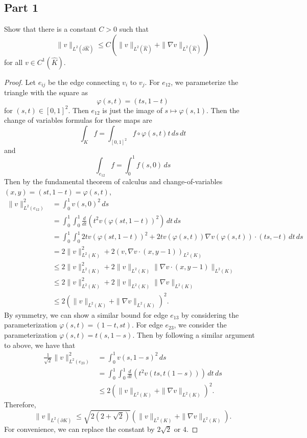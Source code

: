 \documentclass{article}
\theoremstyle{plain}
\begin{document}
\subsection*{Part 1}
Show that there is a constant $C > 0$ such that
\[\|v\|_{L^2(\partial \widehat K)} \leq C(\|v\|_{L^2(\widehat K)} + \|\nabla v\|_{L^2(\widehat K)})\]
for all $v \in C^1(\widehat K)$.
\begin{proof}
	Let  $e_{ij}$ be the edge connecting $v_i$ to $v_j$.
	For $e_{12}$, we parameterize the triangle with the square as
	\[\varphi(s,t) = (ts,1-t)\]
	for $(s,t) \in [0,1]^2$.
	Then $e_{12}$ is just the image of $s \mapsto \varphi(s,1)$.
	Then the change of variables formulas for these maps are
	\[\int_K f = \int_{[0,1]^2} f\circ\varphi(s,t) t\,ds\,dt\]
	and
	\[\int_{e_{12}}f = \int_0^1 f(s,0)\,ds\]
	Then by the fundamental theorem of calculus and change-of-variables $(x,y) = (st, 1-t) = \varphi(s,t)$,
	\begin{align*}
		\|v\|_{L^2(e_{12})}^2 & = \int_0^1v(s,0)^2\,ds                                                                                   \\
		                      & = \int_0^1\int_0^1 \frac{d}{dt}\left(t^2v(\varphi(st,1-t))^2\right)\,dt\,ds                              \\
		                      & = \int_0^1\int_0^1 2tv(\varphi(st,1-t))^2 + 2tv(\varphi(s,t))\nabla v(\varphi(s,t))\cdot (ts,-t)\,dt\,ds \\
		                      & = 2\|v\|_{L^2(K)}^2 + 2(v, \nabla v \cdot (x,y-1))_{L^2(K)}                                              \\
		                      & \leq 2\|v\|_{L^2(K)}^2 + 2\|v\|_{L^2(K)}\|\nabla v \cdot (x,y-1)\|_{L^2(K)}                              \\
		                      & \leq 2\|v\|_{L^2(K)}^2 + 2\|v\|_{L^2(K)}\|\nabla v\|_{L^2(K)}                                            \\
		                      & \leq 2(\|v\|_{L^2(K)} + \|\nabla v\|_{L^2(K)})^2.
	\end{align*}
	By symmetry, we can show a similar bound for edge $e_{13}$ by considering the parameterization $\varphi(s,t) = (1-t,st)$.
	For edge $e_{23}$, we consider the parameterization $\varphi(s,t) = t(s,1-s)$.
	Then by following a similar argument to above, we have that
	\begin{align*}
		\frac{1}{\sqrt{2}}\|v\|_{L^2(e_{23})}^2 & = \int_0^1 v(s,1-s)^2\,ds                                \\
		                                        & = \int_0^1\int_0^1 \frac{d}{dt}(t^2v(ts,t(1-s)))\,dt\,ds \\
		                                        & \leq 2(\|v\|_{L^2(K)} + \|\nabla v\|_{L^2(K)})^2.
	\end{align*}
	Therefore,
	\begin{equation*}
		\|v\|_{L^2(\partial K)} \leq \sqrt{2(2 + \sqrt{2})}(\|v\|_{L^2(K)} + \|\nabla v\|_{L^2(K)}).
	\end{equation*}
	For convenience, we can replace the constant by $2\sqrt{2}$ or $4$.
\end{proof}
\end{document}
